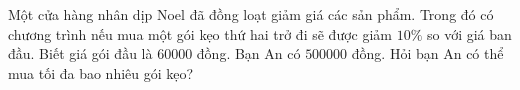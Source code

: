 \begin{ex}
Một cửa hàng nhân dịp Noel đã đồng loạt giảm giá các sản phẩm. Trong đó có chương trình nếu mua một gói kẹo thứ hai trở đi sẽ được giảm $10\%$ so với giá ban đầu. Biết giá gói đầu là $60000$ đồng. Bạn An có $500000$ đồng. Hỏi bạn An có thể mua tối đa bao nhiêu gói kẹo?
\end{ex}
